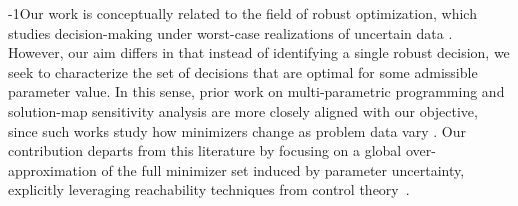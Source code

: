 \documentclass[letterpaper, 10 pt, conference]{ieeeconf}
\newcommand{\?}{\stackrel{?}{=}}
\newcommand{\frank}[1]{{\textcolor[rgb]{0,0,1}{\textsf{[Frank: {#1}]}}}}
\newcommand{\antoine}[1]{{\textcolor[rgb]{1,0,0}{\textsf{[Antoine: {#1}]}}}}
\newcommand{\brendan}[1]{{\textcolor[rgb]{1,0,1}{\textsf{[Brendan: {#1}]}}}}
\begin{document}



\looseness-1Our work is conceptually related to the field of robust optimization, which studies decision-making under worst-case realizations of uncertain data \cite{bertsimas2004price, ben1998robust, bertsimas2011theory}.
However, our aim differs in that
instead of identifying a single robust decision, we seek to characterize the set of decisions that are optimal for some admissible parameter value. 
In this sense, prior work on 
multi-parametric programming
and solution-map sensitivity analysis
are more closely aligned with our objective, since such works study how minimizers change as problem data vary \cite{bonnans2013perturbation, dontchev2009implicit, shapiro2005sensitivity, jones2007lexicographic}. 
Our contribution departs from this literature by focusing on a global over-approximation of the full minimizer set induced by parameter uncertainty, explicitly leveraging reachability techniques from control theory~\cite{bravo2005computation, immrax}.
\end{document}
